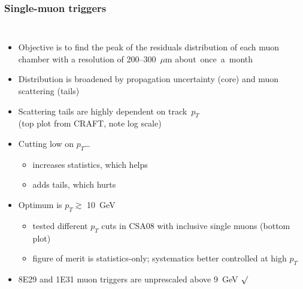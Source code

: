 \documentclass[compress]{beamer}
\begin{document}
\begin{frame}
\frametitle{Single-muon triggers}

\vspace{-0.3 cm}
\begin{columns}

\begin{itemize}
\item Objective is to find the peak of the residuals distribution
  of each muon chamber with a resolution of 200--300~$\mu$m \mbox{about once a month\hspace{-1 cm}}
\item Distribution is broadened by propagation uncertainty
  (core) and muon scattering (tails)
\item Scattering tails are highly dependent on \mbox{track $p_T$\hspace{-1 cm}} \\ (top plot
  from CRAFT, note log scale)
\item Cutting low on $p_T$\ldots

\vspace{-0.2 cm}
\begin{itemize}
\item increases statistics, which helps
\item adds tails, which hurts
\end{itemize}
\vspace{-0.2 cm}

\item Optimum is $p_T \gtrsim$ 10~GeV

\vspace{-0.2 cm}
\begin{itemize}
\item tested different $p_T$ cuts in CSA08 with inclusive single muons (bottom plot)
\item figure of merit is statistics-only; systematics better controlled at high $p_T$
\end{itemize}
\vspace{-0.2 cm}

\item 8E29 and 1E31 muon triggers are unprescaled above 9~GeV \textcolor{red}{$\surd$}
\end{itemize}



\end{columns}
\end{frame}
\end{document}
